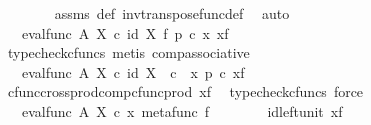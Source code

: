\begin{isabellebody}
\ \ \ \ \ \ \isamarkupfalse%
\ assms\ {\isasymphi}{\isacharunderscore}{\kern0pt}def\ inv{\isacharunderscore}{\kern0pt}transpose{\isacharunderscore}{\kern0pt}func{\isacharunderscore}{\kern0pt}def{}\ \isamarkupfalse%
\ auto\isanewline
\ \ \ \ \isamarkupfalse%
\ \isamarkupfalse%
\ {\isachardoublequoteopen}{\isachardot}{\kern0pt}{\isachardot}{\kern0pt}{\isachardot}{\kern0pt}\ {\isacharequal}{\kern0pt}\ {\isacharparenleft}{\kern0pt}eval{\isacharunderscore}{\kern0pt}func\ A\ X{\isacharparenright}{\kern0pt}\ {\isasymcirc}\isactrlsub c\ {\isacharparenleft}{\kern0pt}id\ X\ {\isasymtimes}\isactrlsub f\ p{\isacharparenright}{\kern0pt}\ {\isasymcirc}\isactrlsub c\ {\isasymlangle}x{\isacharcomma}{\kern0pt}\ x{\isacharunderscore}{\kern0pt}f{\isasymrangle}{\isachardoublequoteclose}\isanewline
\ \ \ \ \ \ \isamarkupfalse%
\ {\isacharparenleft}{\kern0pt}typecheck{\isacharunderscore}{\kern0pt}cfuncs{\isacharcomma}{\kern0pt}\ metis\ comp{\isacharunderscore}{\kern0pt}associative{}{\isacharparenright}{\kern0pt}\isanewline
\ \ \ \ \isamarkupfalse%
\ \isamarkupfalse%
\ {\isachardoublequoteopen}{\isachardot}{\kern0pt}{\isachardot}{\kern0pt}{\isachardot}{\kern0pt}\ {\isacharequal}{\kern0pt}\ {\isacharparenleft}{\kern0pt}eval{\isacharunderscore}{\kern0pt}func\ A\ X{\isacharparenright}{\kern0pt}\ {\isasymcirc}\isactrlsub c\ {\isasymlangle}id\ X\ \ {\isasymcirc}\isactrlsub c\ \ x{\isacharcomma}{\kern0pt}\ p\ {\isasymcirc}\isactrlsub c\ x{\isacharunderscore}{\kern0pt}f{\isasymrangle}{\isachardoublequoteclose}\isanewline
\ \ \ \ \ \ \isamarkupfalse%
\ cfunc{\isacharunderscore}{\kern0pt}cross{\isacharunderscore}{\kern0pt}prod{\isacharunderscore}{\kern0pt}comp{\isacharunderscore}{\kern0pt}cfunc{\isacharunderscore}{\kern0pt}prod\ x{\isacharunderscore}{\kern0pt}f\ \isamarkupfalse%
\ {\isacharparenleft}{\kern0pt}typecheck{\isacharunderscore}{\kern0pt}cfuncs{\isacharcomma}{\kern0pt}\ force{\isacharparenright}{\kern0pt}\isanewline
\ \ \ \ \isamarkupfalse%
\ \isamarkupfalse%
\ {\isachardoublequoteopen}{\isachardot}{\kern0pt}{\isachardot}{\kern0pt}{\isachardot}{\kern0pt}\ {\isacharequal}{\kern0pt}\ {\isacharparenleft}{\kern0pt}eval{\isacharunderscore}{\kern0pt}func\ A\ X{\isacharparenright}{\kern0pt}\ {\isasymcirc}\isactrlsub c\ {\isasymlangle}x{\isacharcomma}{\kern0pt}\ metafunc\ f{\isasymrangle}{\isachardoublequoteclose}\isanewline
\ \ \ \ \ \ \isamarkupfalse%
\ id{\isacharunderscore}{\kern0pt}left{\isacharunderscore}{\kern0pt}unit{}\ x{\isacharunderscore}{\kern0pt}f\ \isamarkupfalse%

\end{isabellebody}
